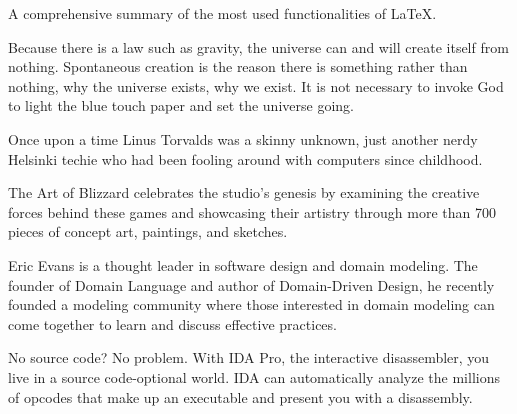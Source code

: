 \documentclass{article}
\begin{document}
A comprehensive summary of the most used functionalities of LaTeX. \cite{Menetrey2016LaTeX}

Because there is a law such as gravity, the universe can and will create itself from nothing. Spontaneous creation is the reason there is something rather than nothing, why the universe exists, why we exist. It is not necessary to invoke God to light the blue touch paper and set the universe going. \cite{Hawking2010Grand}

Once upon a time Linus Torvalds was a skinny unknown, just another nerdy Helsinki techie who had been fooling around with computers since childhood. \cite{Torvalds2001Just}

The Art of Blizzard celebrates the studio's genesis by examining the creative forces behind these games and showcasing their artistry through more than 700 pieces of concept art, paintings, and sketches. \cite{Entertainment2011Art}

Eric Evans is a thought leader in software design and domain modeling. The founder of Domain Language and author of Domain-Driven Design, he recently founded a modeling community where those interested in domain modeling can come together to learn and discuss effective practices. \cite{Evans2003Domain}

No source code? No problem. With IDA Pro, the interactive disassembler, you live in a source code-optional world. IDA can automatically analyze the millions of opcodes that make up an executable and present you with a disassembly. \cite{Eagle2011IDA}

\printbibheading
\printbibliography[type=book,heading=subbibliography,title={Book Sources}]
\printbibliography[nottype=book,heading=subbibliography,title={Other Sources}]
\end{document}

